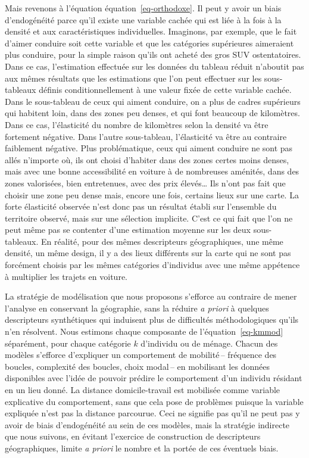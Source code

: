 \documentclass[
  9pt,
  a4paper,
  DIV=11]{scrreprt}
\begin{document}
Mais revenons à l'équation équation~\ref{eq-orthodoxe}. Il peut y avoir
un biais d'endogénéité parce qu'il existe une variable cachée qui est
liée à la fois à la densité et aux caractéristiques individuelles.
Imaginons, par exemple, que le fait d'aimer conduire soit cette variable
et que les catégories supérieures aimeraient plus conduire, pour la
simple raison qu'ils ont acheté des gros SUV ostentatoires. Dans ce cas,
l'estimation effectuée sur les données du tableau réduit n'aboutit pas
aux mêmes résultats que les estimations que l'on peut effectuer sur les
sous-tableaux définis conditionnellement à une valeur fixée de cette
variable cachée. Dans le sous-tableau de ceux qui aiment conduire, on a
plus de cadres supérieurs qui habitent loin, dans des zones peu denses,
et qui font beaucoup de kilomètres. Dans ce cas, l'élasticité du nombre
de kilomètres selon la densité va être fortement négative. Dans l'autre
sous-tableau, l'élasticité va être au contraire faiblement négative.
Plus problématique, ceux qui aiment conduire ne sont pas allés n'importe
où, ils ont choisi d'habiter dans des zones certes moins denses, mais
avec une bonne accessibilité en voiture à de nombreuses aménités, dans
des zones valorisées, bien entretenues, avec des prix élevés\ldots{} Ils
n'ont pas fait que choisir une zone peu dense mais, encore une fois,
certains lieux sur une carte. La forte élasticité observée n'est donc
pas un résultat établi sur l'ensemble du territoire observé, mais sur
une sélection implicite. C'est ce qui fait que l'on ne peut même pas se
contenter d'une estimation moyenne sur les deux sous-tableaux. En
réalité, pour des mêmes descripteurs géographiques, une même densité, un
même design, il y a des lieux différents sur la carte qui ne sont pas
forcément choisis par les mêmes catégories d'individus avec une même
appétence à multiplier les trajets en voiture.

La stratégie de modélisation que nous proposons s'efforce au contraire
de mener l'analyse en conservant la géographie, sans la réduire \emph{a
priori} à quelques descripteurs synthétiques qui induisent plus de
difficultés méthodologiques qu'ils n'en résolvent. Nous estimons chaque
composante de l'équation~\ref{eq-kmmod} séparément, pour chaque
catégorie \(k\) d'individu ou de ménage. Chacun des modèles s'efforce
d'expliquer un comportement de mobilité\,-- fréquence des boucles,
complexité des boucles, choix modal\,-- en mobilisant les données
disponibles avec l'idée de pouvoir prédire le comportement d'un individu
résidant en un lieu donné. La distance domicile-travail est mobilisée
comme variable explicative du comportement, sans que cela pose de
problèmes puisque la variable expliquée n'est pas la distance parcourue.
Ceci ne signifie pas qu'il ne peut pas y avoir de biais d'endogénéité au
sein de ces modèles, mais la stratégie indirecte que nous suivons, en
évitant l'exercice de construction de descripteurs géographiques, limite
\emph{a priori} le nombre et la portée de ces éventuels biais.
\end{document}
